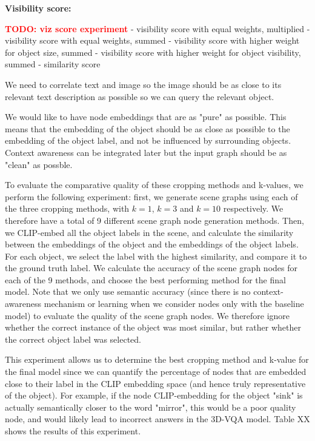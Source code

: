 \bigskip
\textbf{Visibility score:}

\textcolor{red}{\textbf{TODO: viz score experiment}}
- visibility score with equal weights, multiplied
- visibility score with equal weights, summed
- visibility score with higher weight for object size, summed
- visibility score with higher weight for object visibility, summed
- similarity score

We need to correlate text and image so the image should be as close to its relevant text description as possible so we can query the relevant object.

We would like to have node embeddings that are as "pure" as possible. This means that the embedding of the object should be as close as possible to the embedding of the object label, and not be influenced by surrounding objects. Context awareness can be integrated later but the input graph should be as "clean" as possble.

To evaluate the comparative quality of these cropping methods and k-values, we perform the following experiment: first, we generate scene graphs using each of the three cropping methods, with $k=1$, $k=3$ and $k=10$ respectively. We therefore have a total of 9 different scene graph node generation methods. Then, we CLIP-embed all the object labels in the scene, and calculate the similarity between the embeddings of the object and the embeddings of the object labels. For each object, we select the label with the highest similarity, and compare it to the ground truth label. We calculate the accuracy of the scene graph nodes for each of the 9 methods, and choose the best performing method for the final model.  Note that we only use semantic accuracy (since there is no context-awareness mechanism or learning when we consider nodes only with the baseline model) to evaluate the quality of the scene graph nodes. We therefore ignore whether the correct instance of the object was most similar, but rather whether the correct object label was selected.

This experiment allows us to determine the best cropping method and k-value for the final model since we can quantify the percentage of nodes that are embedded close to their label in the CLIP embedding space (and hence truly representative of the object). For example, if the node CLIP-embedding for the object "sink" is actually semantically closer to the word "mirror", this would be a poor quality node, and would likely lead to incorrect answers in the 3D-VQA model. Table XX shows the results of this experiment.


